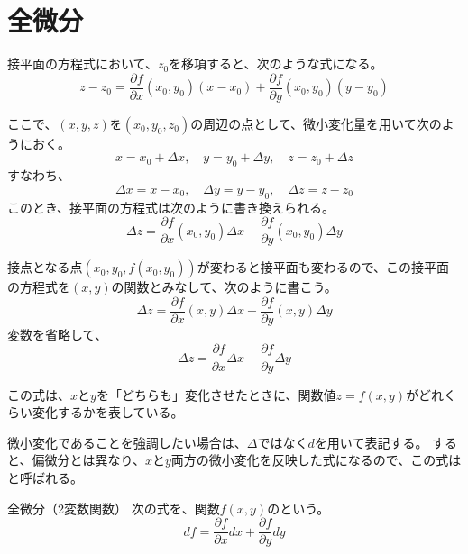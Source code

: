 \documentclass[../../../topic_calculus]{subfiles}
\begin{document}
\sectionline
\section{全微分}\label{sec:total-derivative}

接平面の方程式において、$z_0$を移項すると、次のような式になる。
\begin{equation*}
  z - z_0 = \frac{\partial f}{\partial x}(x_0,y_0)(x - x_0) + \frac{\partial f}{\partial y}(x_0,y_0)(y - y_0)
\end{equation*}

ここで、$(x,y,z)$を$(x_0,y_0,z_0)$の周辺の点として、微小変化量を用いて次のようにおく。
\begin{equation*}
  x = x_0 + \Delta x, \quad
  y = y_0 + \Delta y, \quad
  z = z_0 + \Delta z
\end{equation*}
すなわち、
\begin{equation*}
  \Delta x = x - x_0, \quad
  \Delta y = y - y_0, \quad
  \Delta z = z - z_0
\end{equation*}
このとき、接平面の方程式は次のように書き換えられる。
\begin{equation*}
  \Delta z = \frac{\partial f}{\partial x}(x_0,y_0)\Delta x + \frac{\partial f}{\partial y}(x_0,y_0)\Delta y
\end{equation*}

接点となる点$(x_0,y_0,f(x_0, y_0))$が変わると接平面も変わるので、この接平面の方程式を$(x,y)$の関数とみなして、次のように書こう。
\begin{equation*}
  \Delta z = \frac{\partial f}{\partial x}(x,y)\Delta x + \frac{\partial f}{\partial y}(x,y)\Delta y
\end{equation*}
変数を省略して、
\begin{equation*}
  \Delta z = \frac{\partial f}{\partial x}\Delta x + \frac{\partial f}{\partial y}\Delta y
\end{equation*}

この式は、$x$と$y$を「どちらも」変化させたときに、関数値$z=f(x,y)$がどれくらい変化するかを表している。

微小変化であることを強調したい場合は、$\Delta$ではなく$d$を用いて表記する。
すると、偏微分とは異なり、$x$と$y$両方の微小変化を反映した式になるので、この式はと呼ばれる。

\begin{definition}{全微分（2変数関数）}
  次の式を、関数$f(x,y)$のという。
  \begin{equation}
    df = \frac{\partial f}{\partial x}dx + \frac{\partial f}{\partial y}dy
  \end{equation}
\end{definition}
\end{document}
